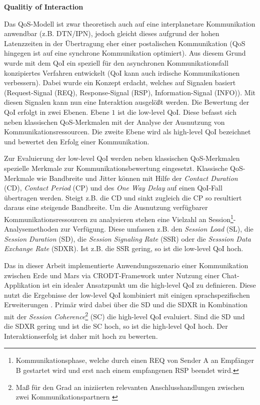 \textbf{Qualitiy of Interaction} 

Das \gls{QoS}-Modell ist zwar theoretisch auch auf eine interplanetare Kommunikation
anwendbar (z.B. \gls{DTN}/\gls{IPN}), jedoch gleicht dieses aufgrund der hohen
Latenzzeiten in der {\"U}bertragung eher einer postalischen Kommunikation (\gls{QoS} hingegen
ist auf eine synchrone Kommunikation optimiert). Aus diesem Grund wurde mit dem
\gls{QoI} ein speziell f{\"u}r den asynchronen
Kommunikationsfall konzipiertes Verfahren entwickelt \cite{Daher2} (\gls{QoI}
kann auch irdische Kommunikationen verbessern). Dabei wurde ein Konzept erdacht,
welches auf Signalen basiert (Request-Signal (REQ), Response-Signal
(RSP), Information-Signal (INFO)). Mit diesen Signalen kann nun eine
Interaktion ausgel{\"o}{\ss}t werden. Die Bewertung der \gls{QoI} erfolgt in zwei Ebenen. Ebene $1$ ist die low-level \gls{QoI}. Diese befasst sich neben klassischen \gls{QoS}-Merkmalen mit der Analyse der Ausnutzung von
Kommunikationsressourcen. Die zweite Ebene wird als high-level \gls{QoI}
bezeichnet und bewertet den Erfolg einer Kommunikation.

Zur Evaluierung der low-level \gls{QoI} werden neben klassischen \gls{QoS}-Merkmalen
spezielle Merkmale zur Kommunikationsbewertung eingesetzt. Klassische
\gls{QoS}-Merkmale wie Bandbreite und Jitter k{\"o}nnen mit Hilfe der
\textit{Contact Duration} (CD), \textit{Contact Period} (CP) und des \textit{One
Way Delay} auf einen \gls{QoI}-Fall übertragen werden. Steigt z.B. die CD und
sinkt zugleich die CP so resultiert daraus eine steigende Bandbreite. Um die
Ausnutzung verf{\"u}gbarer Kommunikationsressourcen zu analysieren stehen eine
Vielzahl an Session\footnote{Kommunikationsphase, welche durch einen REQ von Sender A an
Empf{\"a}nger B gestartet wird und erst nach einem empfangenen RSP beendet
wird.}-Analysemethoden zur Verf{\"u}gung. Diese umfassen z.B. den
\textit{Session Load} (SL), die \textit{Session Duration} (SD), die
\textit{Session Signaling Rate} (SSR) oder die \textit{Sesssion Data Exchange Rate} (SDXR). Ist
z.B. die SSR gering, so ist die low-level \gls{QoI} hoch.

Das in dieser Arbeit implementierte Anwendungsszenario einer Kommunikation
zwischen Erde und Mars via \gls{CRODT}-Framework unter Nutzung einer
Chat-Applikation ist ein idealer Ansatzpunkt um die high-level \gls{QoI} zu
definieren. Diese nutzt die Ergebnisse der low-level \gls{QoI} kombiniert mit
einigen sprachspezifischen Erweiterungen \cite{Donick}. Prim{\"a}r wird dabei
{\"u}ber die SD und die SDXR in Kombination mit der \textit{Session
Coherence}\footnote{Ma{\ss} f{\"u}r den Grad an iniziierten relevanten
Anschlusshandlungen zwischen zwei Kommunikationspartnern \cite{Donick}} (SC) die
high-level \gls{QoI} evaluiert. Sind die SD und die SDXR gering und ist die SC hoch,
so ist die high-level \gls{QoI} hoch.
Der Interaktionserfolg ist daher mit hoch zu bewerten.

